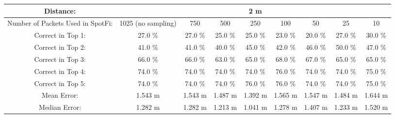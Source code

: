 \begin{tabular}{| c || c | c | c | c | c | c | c | c |}
\hline
Distance: &  &  &  & 2 m  &  &  &  &  \\
\hline
Number of Packets Used in SpotFi: & 1025 (no sampling) & 750 & 500 & 250 & 100 & 50 & 25 & 10 \\
\hline
\hline
Correct in Top 1: & 27.0 \% & 27.0 \% & 25.0 \% & 25.0 \% & 23.0 \% & 20.0 \% & 27.0 \% & 30.0 \% \\
\hline
Correct in Top 2: & 41.0 \% & 41.0 \% & 40.0 \% & 45.0 \% & 42.0 \% & 46.0 \% & 50.0 \% & 47.0 \% \\
\hline
Correct in Top 3: & 66.0 \% & 66.0 \% & 63.0 \% & 65.0 \% & 68.0 \% & 67.0 \% & 65.0 \% & 65.0 \% \\
\hline
Correct in Top 4: & 74.0 \% & 74.0 \% & 74.0 \% & 74.0 \% & 76.0 \% & 74.0 \% & 74.0 \% & 75.0 \% \\
\hline
Correct in Top 5: & 74.0 \% & 74.0 \% & 74.0 \% & 76.0 \% & 76.0 \% & 74.0 \% & 74.0 \% & 75.0 \% \\
\hline
\hline
Mean Error: & 1.543 m & 1.543 m & 1.487 m & 1.392 m & 1.565 m & 1.547 m & 1.484 m & 1.644 m \\
\hline
Median Error: & 1.282 m & 1.282 m & 1.213 m & 1.041 m & 1.278 m & 1.407 m & 1.233 m & 1.520 m \\
\hline
\end{tabular}